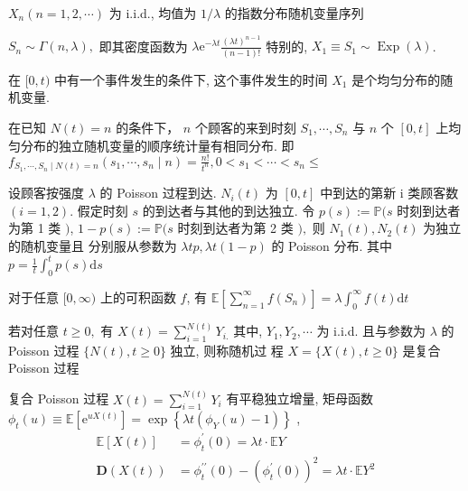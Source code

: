 \documentclass[10pt]{yerbaformat}
\begin{document}
\begin{lemma}[来到时间间隔分布]
    $X_{n}(n=1,2, \cdots)$ 为 i.i.d., 均值为 $1 / \lambda$ 的指数分布随机变量序列
\end{lemma}

\begin{lemma}[等待时间分布]
    $S_{n} \sim \Gamma(n, \lambda),$ 即其密度函数为 $\lambda \mathrm{e}^{-\lambda t} \frac{(\lambda t)^{n-1}}{(n-1) !}$ 特别的, $X_{1} \equiv S_{1} \sim \operatorname{Exp}(\lambda)$.
\end{lemma}

\begin{lemma}
    在 $[0, t)$ 中有一个事件发生的条件下, 这个事件发生的时间 $X_{1}$ 是个均匀分布的随机变量.
\end{lemma}

\begin{theorem}
    在已知 $N(t)=n$ 的条件下， $n$ 个顾客的来到时刻 $S_{1}, \cdots, S_{n}$ 与 $n$ 个 $[0, t]$ 上均匀分布的独立随机变量的顺序统计量有相同分布. 即 $f_{S_{1}, \cdots, S_{n} \mid N(t)=n}\left(s_{1}, \cdots, s_{n} \mid n\right)=\frac{n !}{t^{n}}, 0<s_{1}<\cdots<s_{n} \leq $
\end{theorem}

\begin{theorem}
    设顾客按强度 $\lambda$ 的 Poisson 过程到达. $N_{i}(t)$ 为 $[0, t]$ 中到达的第新 $\mathrm{i}$ 类顾客数 $(i=1,2) .$ 假定时刻 $s$ 的到达者与其他的到达独立. 令
$p(s):=\mathbb{P}(s$ 时刻到达者为第 1 类 $)$, $1-p(s):=\mathbb{P}(s$ 时刻到达者为第 2 类 $),$ 则 $N_{1}(t), N_{2}(t)$ 为独立的随机变量且 分别服从参数为 $\lambda t p, \lambda t(1-p)$ 的 Poisson 分布. 其中 $p=\frac{1}{t} \int_{0}^{t} p(s) \mathrm{d} s$
\end{theorem}

\begin{lemma}
    对于任意 $[0, \infty)$ 上的可积函数 $f$, 有 $\mathbb{E}\left[\sum_{n=1}^{\infty} f\left(S_{n}\right)\right]=\lambda \int_{0}^{\infty} f(t) \mathrm{d} t$
\end{lemma}

\begin{definition}[复合 Poisson 过程]
    若对任意 $t \geq 0,$ 有 $X(t)=\sum_{i=1}^{N(t)} Y_{i .}$ 其中, $Y_{1}, Y_{2}, \cdots$ 为 i.i.d. 且与参数为 $\lambda$ 的 Poisson 过程 $\{N(t), t \geq 0\}$ 独立, 则称随机过 程 $X=\{X(t), t \geq 0\}$ 是复合 Poisson 过程
\end{definition}

\begin{theorem}
    复合 Poisson 过程 $X(t)=\sum_{i=1}^{N(t)} Y_{i}$ 有平稳独立增量, 矩母函数 $\phi_{t}(u) \equiv \mathbb{E}\left[\mathrm{e}^{u X(t)}\right]=\exp \left\{\lambda t\left(\phi_{Y}(u)-1\right)\right\}$ , $$\begin{aligned} \mathbb{E}[X(t)] &=\phi_{t}^{\prime}(0)=\lambda t \cdot \mathbb{E} Y \\ \mathbf{D}(X(t)) &=\phi_{t}^{\prime \prime}(0)-\left(\phi_{t}^{\prime}(0)\right)^{2}=\lambda t \cdot \mathbb{E} Y^{2} \end{aligned}$$
\end{theorem}
\end{document}
